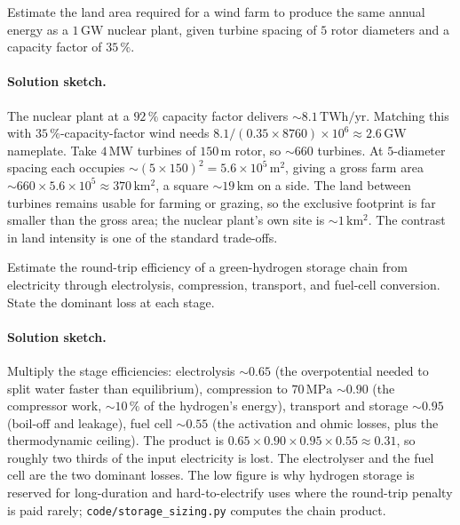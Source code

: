 \begin{exercise}
Estimate the land area required for a wind farm to produce the same
annual energy as a $1\,\si{\giga\watt}$ nuclear plant, given turbine
spacing of $5$ rotor diameters and a capacity factor of $35\,\%$.
\paragraph{Solution sketch.}
The nuclear plant at a $92\,\%$ capacity factor delivers $\sim 8.1\,
\text{TWh}/\text{yr}$. Matching this with $35\,\%$-capacity-factor
wind needs $8.1/(0.35\times8760)\times10^6 \approx 2.6\,\si{\giga\watt}$
nameplate. Take $4\,\si{\mega\watt}$ turbines of $150\,\si{\meter}$
rotor, so $\sim 660$ turbines. At $5$-diameter spacing each occupies
$\sim (5\times150)^2 = 5.6\times10^{5}\,\si{\meter\squared}$, giving a
gross farm area $\sim 660\times5.6\times10^{5} \approx 370\,\si{\kilo
\meter\squared}$, a square $\sim 19\,\si{\kilo\meter}$ on a side. The
land between turbines remains usable for farming or grazing, so the
exclusive footprint is far smaller than the gross area; the nuclear
plant's own site is $\sim 1\,\si{\kilo\meter\squared}$. The contrast in
land intensity is one of the standard trade-offs.
\end{exercise}

\begin{exercise}
Estimate the round-trip efficiency of a green-hydrogen storage chain
from electricity through electrolysis, compression, transport, and
fuel-cell conversion. State the dominant loss at each stage.
\paragraph{Solution sketch.}
Multiply the stage efficiencies: electrolysis $\sim 0.65$ (the
overpotential needed to split water faster than equilibrium),
compression to $70\,\si{\mega\pascal}$ $\sim 0.90$ (the compressor work,
$\sim 10\,\%$ of the hydrogen's energy), transport and storage $\sim
0.95$ (boil-off and leakage), fuel cell $\sim 0.55$ (the activation and
ohmic losses, plus the thermodynamic ceiling). The product is $0.65
\times0.90\times0.95\times0.55 \approx 0.31$, so roughly two thirds of
the input electricity is lost. The electrolyser and the fuel cell are
the two dominant losses. The low figure is why hydrogen storage is
reserved for long-duration and hard-to-electrify uses where the
round-trip penalty is paid rarely; \texttt{code/storage\_sizing.py}
computes the chain product.
\end{exercise}

